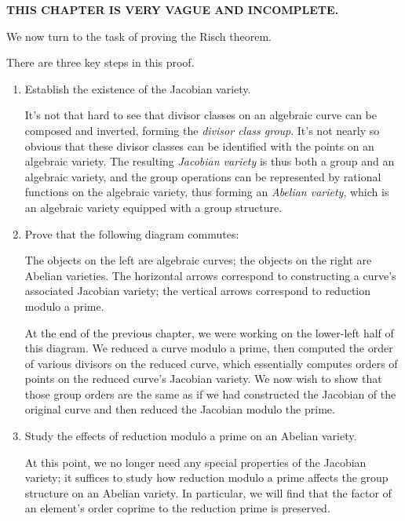 

{\bf THIS CHAPTER IS VERY VAGUE AND INCOMPLETE.}

We now turn to the task of proving the Risch theorem.

There are three key steps in this proof.

\begin{enumerate}

\item Establish the existence of the Jacobian variety.

It's not that hard to see that divisor classes on an algebraic curve
can be composed and inverted, forming the {\it divisor class group}.
It's not nearly so obvious that these divisor classes can be
identified with the points on an algebraic variety.  The resulting
{\it Jacobian variety} is thus both a group and an algebraic variety,
and the group operations can be represented by rational functions on
the algebraic variety, thus forming an {\it Abelian variety},
which is an algebraic variety equipped with a group structure.

\item Prove that the following diagram commutes:

\begin{center}
\Large
{}
\end{center}

The objects on the left are algebraic curves; the objects on the right
are Abelian varieties.  The horizontal arrows correspond to constructing
a curve's associated Jacobian variety; the vertical arrows correspond
to reduction modulo a prime.

At the end of the previous chapter, we were working on the lower-left
half of this diagram.  We reduced a curve modulo a prime, then computed
the order of various divisors on the reduced curve, which essentially
computes orders of points on the reduced curve's Jacobian variety.
We now wish to show that those group orders are the same as if we
had constructed the Jacobian of the original curve and then reduced
the Jacobian modulo the prime.

\item Study the effects of reduction modulo a prime on an Abelian variety.

At this point, we no longer need any special properties of the
Jacobian variety; it suffices to study how reduction modulo a prime
affects the group structure on an Abelian variety.  In particular, we
will find that the factor of an element's order coprime to the
reduction prime is preserved.

\end{enumerate}

